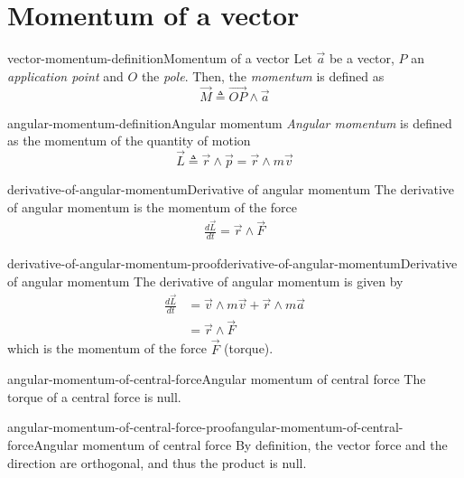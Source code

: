 \documentclass[preview]{standalone}
\begin{document}
\genpage

\section{Momentum of a vector}

\begin{snippetdefinition}{vector-momentum-definition}{Momentum of a vector}
    Let \(\vec{a}\) be a vector, \(P\) an \emph{application point}
    and \(O\) the \emph{pole}. Then, the \emph{momentum} is defined as
    \[
        \vec{M} \triangleq \vec{OP} \wedge \vec{a}
    \]
\end{snippetdefinition}

\begin{snippetdefinition}{angular-momentum-definition}{Angular momentum}
    \emph{Angular momentum} is defined as the momentum of the quantity of motion
    \[
        \vec{L} \triangleq \vec{r} \wedge \vec{p} = \vec{r} \wedge m\vec{v}
    \]
\end{snippetdefinition}

\begin{snippetproposition}{derivative-of-angular-momentum}{Derivative of angular momentum}
    The derivative of angular momentum is the momentum of the force
    \begin{align*}
        \frac{d\vec{L}}{dt} = \vec{r} \wedge \vec{F} 
    \end{align*}
\end{snippetproposition}

\begin{snippetproof}{derivative-of-angular-momentum-proof}{derivative-of-angular-momentum}{Derivative of angular momentum}
    The derivative of angular momentum is given by
    \begin{align*}
        \frac{d\vec{L}}{dt} &= \vec{v} \wedge m\vec{v} + \vec{r} \wedge m\vec{a} \\
        &= \vec{r} \wedge \vec{F}
    \end{align*}
    which is the momentum of the force \(\vec{F}\) (torque).
\end{snippetproof}

\begin{snippetproposition}{angular-momentum-of-central-force}{Angular momentum of central force}
    The torque of a central force is null.
\end{snippetproposition}

\begin{snippetproof}{angular-momentum-of-central-force-proof}{angular-momentum-of-central-force}{Angular momentum of central force}
    By definition, the vector force and the direction are orthogonal, and thus the product is null.
\end{snippetproof}
\end{document}
